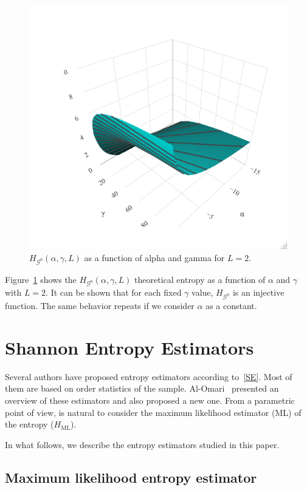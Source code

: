 \documentclass[journal]{IEEEtran}
\begin{document}
\begin{figure}[hbt]
	\centering    
	\includegraphics[width=0.8\linewidth]{../../../Figures/CISS2021/entropiaL2.png}
	\caption{$H_{\mathcal G^0}(\alpha,\gamma,L)$ as a function of alpha and gamma for $L=2$.\label{figure:HG0}}
\end{figure}


Figure~\ref{figure:HG0} shows the $H_{\mathcal G^0}(\alpha,\gamma,L)$ theoretical entropy as a function of $\alpha$ and $\gamma$ with $L=2$. 
It can be shown that for each fixed $\gamma$ value, $H_{\mathcal G^0}$ is an injective function. The same behavior repeats if we consider $\alpha$ as a constant.

\section{Shannon Entropy Estimators}

Several authors have proposed entropy estimators according to~\eqref{SE}.
Most of them are based on order statistics of the sample. 
Al-Omari~\cite{AlOmari2016} presented an overview of these estimators and also proposed a new one. 
From a parametric point of view, is natural to consider the maximum likelihood estimator (ML) of the entropy ($H_{\text{ML}}$).

In what follows, we describe the entropy estimators studied in this paper.

\subsection{Maximum likelihood entropy estimator}
\end{document}
